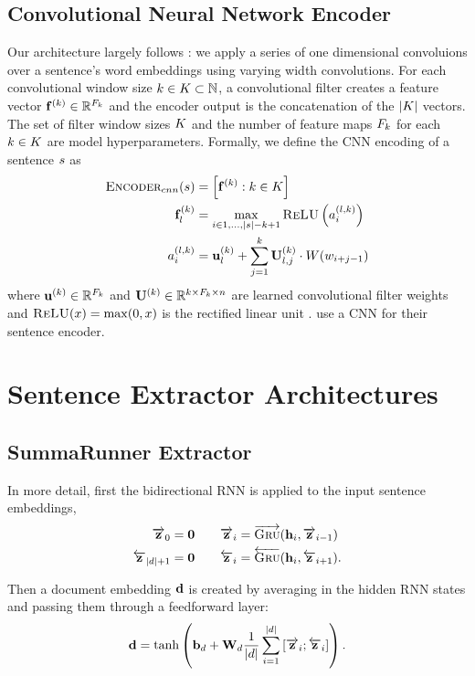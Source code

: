 \begin{appendices}
\subsection{Convolutional Neural Network Encoder}

Our architecture largely follows \cite{kim2014convolutional}: 
we apply a 
series of one dimensional convoluions over a sentence's word embeddings
using varying width convolutions. For each convolutional window size 
$k \in K \subset \mathbb{N}$, a convolutional filter creates 
a feature vector $\mathbf{f}_{}^{( k )} \in \mathbb{R}^{F_k}$ 
and the encoder output is the concatenation of the $|K|$ vectors. 
The set of filter window sizes $K$ and the number of feature maps
$F_k$ for each $k \in K$ are 
model hyperparameters.
Formally, we define the CNN encoding of a sentence $s$ as 
\begin{align}
\textsc{Encoder}_{cnn}(s) & = \left[\mathbf{f}_{}^{( k )} : k \in K \right]\\
\mathbf{f}_{l}^{( k )} &= 
     \max_{i \in 1,\dots, |s| - k + 1} 
       \textsc{ReLU}\left(a^{(l,k)}_i \right) \\
a^{(l,k)}_i &= \mathbf{u}^{(k)}_l
    + \sum^{k}_{j=1} \mathbf{U}^{(k)}_{l,j} \cdot W(w_{i + j -1})
\end{align}
where $\mathbf{u}^{(k)} \in \mathbb{R}^{F_k}$ and $\mathbf{U}^{(k)} \in \mathbb{R}^{k \times F_k \times n}$
are learned convolutional filter weights and $\textsc{ReLU}(x) = \max(0, x)$ 
is the rectified linear unit \citep{nair2010rectified}. \cite{cheng2016neural}
use a CNN for their sentence encoder.


\section{Sentence Extractor Architectures}
\subsection{SummaRunner Extractor}
In more detail, first the bidirectional RNN is applied to the input 
sentence embeddings,
\begin{align}
    \overrightarrow{\mathbf{z}}_0 = \textbf{0}&\quad \quad \overrightarrow{\mathbf{z}}_i = \overrightarrow{\textsc{Gru}}(\mathbf{h}_i, \overrightarrow{\mathbf{z}}_{i-1}) \\
    \overleftarrow{\mathbf{z}}_{| d | + 1} = \textbf{0}& \quad \quad \overleftarrow{\mathbf{z}}_i = \overleftarrow{\textsc{Gru}}(\mathbf{h}_i, \overleftarrow{\mathbf{z}}_{i+1}).
\end{align}

Then a document embedding $\mathbf{d}$ is created by averaging in the hidden
RNN states and passing them through a feedforward layer: 
\begin{align}
    \mathbf{d} = \tanh\left(\mathbf{b}_d + \mathbf{W}_d\frac{1}{| d |}
    \sum_{i=1}^{| d |} \left[\overrightarrow{\mathbf{z}}_i; \overleftarrow{\mathbf{z}}_i\right] \right).
\end{align}


\end{appendices}
